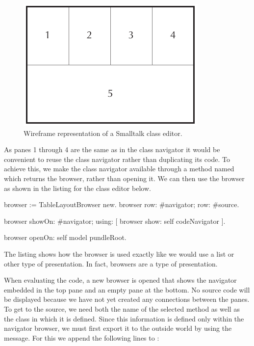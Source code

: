 \documentclass[a4paper,10pt,twoside]{book}
\begin{document}
\begin{figure}[htbp]
\centerline{\includegraphics[width=\linewidth]{classbrowser_wireframe.pdf}}
\caption{Wireframe representation of a Smalltalk class editor.}
\label{fig:classbrowser_wireframe}
\end{figure}

As panes 1 through 4 are the same as in the class navigator it would be convenient to reuse the class navigator rather than duplicating its code. To achieve this, we make the class navigator available through a method named  which returns the browser, rather than opening it. We can then use the browser as shown in the listing for the class editor below.

\begin{code}{}
browser := TableLayoutBrowser new.
browser
	row: #navigator;
	row: #source.

browser showOn: #navigator; using: [
	browser show: self codeNavigator
].

browser openOn: self model pundleRoot.
\end{code}

The listing shows how the browser is used exactly like we would use a list or other type of presentation. In fact, browsers are a type of presentation.

When evaluating the code, a new browser is opened that shows the navigator embedded in the top pane and an empty pane at the bottom. No source code will be displayed because we have not yet created any connections between the panes. To get to the source, we need both the name of the selected method as well as the class in which it is defined. Since this information is defined only within the navigator browser, we must first export it to the outside world by using the  message. For this we append the following lines to :
\end{document}
